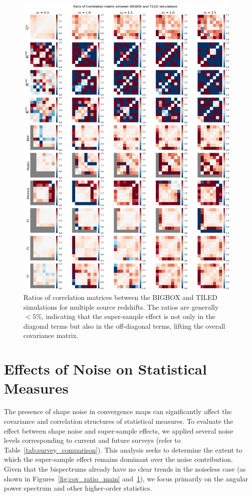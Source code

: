 \begin{figure}[p]
    \centering
    \includegraphics[width=\textwidth]{figures/results/corr_ratio.png}
    \caption[Ratios of Correlation Matrices between BIGBOX and TILED Simulations]{Ratios of correlation matrices between the BIGBOX and TILED simulations for multiple source redshifts. The ratios are generally $ < 5\%$, indicating that the super-sample effect is not only in the diagonal terms but also in the off-diagonal terms, lifting the overall covariance matrix.}
    \label{fig:corr_ratio_main}
\end{figure}

\clearpage

\section{Effects of Noise on Statistical Measures}
The presence of shape noise in convergence maps can significantly affect the covariance and correlation structures of statistical measures. To evaluate the effect between shape noise and super-sample effects, we applied several noise levels corresponding to current and future surveys (refer to Table~\ref{tab:survey_comparison}). This analysis seeks to determine the extent to which the super-sample effect remains dominant over the noise contribution. Given that the bispectrums already have no clear trends in the noiseless case (as shown in Figures~\ref{fig:cov_ratio_main} and~\ref{fig:corr_ratio_main}), we focus primarily on the angular power spectrum and other higher-order statistics.

